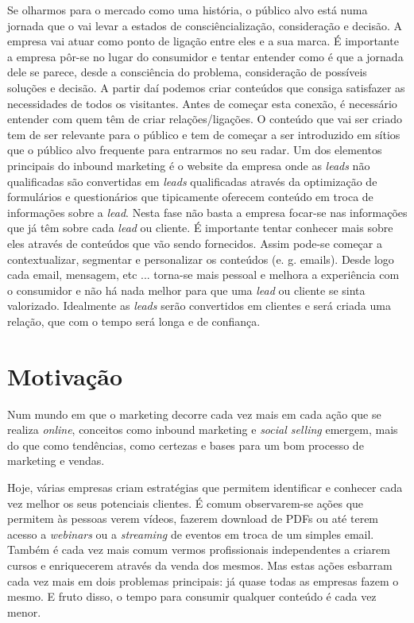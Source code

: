 Se olharmos para o mercado como uma história, o público alvo está numa jornada que o vai levar a estados de consciêncialização, consideração e decisão. A empresa vai atuar como ponto de ligação entre eles e a sua marca.
É importante a empresa pôr-se no lugar do consumidor e tentar entender como é que a jornada dele se parece, desde a consciência do problema, consideração de possíveis soluções e decisão. A partir daí podemos criar conteúdos que consiga satisfazer as necessidades de todos os visitantes.
Antes de começar esta conexão, é necessário entender com quem têm de criar relações/ligações. O conteúdo que vai ser criado tem de ser relevante para o público e tem de começar a ser introduzido em sítios que o público alvo frequente para entrarmos no seu radar. 
Um dos elementos principais do inbound marketing é o website da empresa onde as \textit{leads} não qualificadas são convertidas em \textit{leads} qualificadas através da optimização de formulários e questionários que tipicamente oferecem conteúdo em troca de informações sobre a \textit{lead}. 
Nesta fase não basta a empresa focar-se nas informações que já têm sobre cada \textit{lead} ou cliente. É importante tentar conhecer mais sobre eles através de conteúdos que vão sendo fornecidos. Assim pode-se começar a contextualizar, segmentar e personalizar os conteúdos (e. g. emails). Desde logo cada email, mensagem, etc ... torna-se mais pessoal e melhora a experiência com o consumidor e não há nada melhor para que uma \textit{lead} ou cliente se sinta valorizado.
Idealmente as \textit{leads} serão convertidos em clientes e será criada uma relação, que com o tempo será longa e de confiança.



\section{Motivação}
\label{subsec:motivacao}

Num mundo em que o marketing decorre cada vez mais em cada ação que se realiza \textit{online}, conceitos como inbound marketing e \textit{\gls{social selling}} emergem, mais do que como tendências, como certezas e bases para um bom processo de marketing e vendas.

Hoje, várias empresas criam estratégias que permitem identificar e conhecer cada vez melhor os seus potenciais clientes. É comum observarem-se ações que permitem às pessoas verem vídeos, fazerem download de PDFs ou até terem acesso a \textit{\gls{webinars}} ou a \textit{streaming} de eventos em troca de um simples email. Também é cada vez mais comum vermos profissionais independentes a criarem cursos e enriquecerem através da venda dos mesmos.
Mas estas ações esbarram cada vez mais em dois problemas principais: já quase todas as empresas fazem o mesmo. E fruto disso, o tempo para consumir qualquer conteúdo é cada vez menor.

